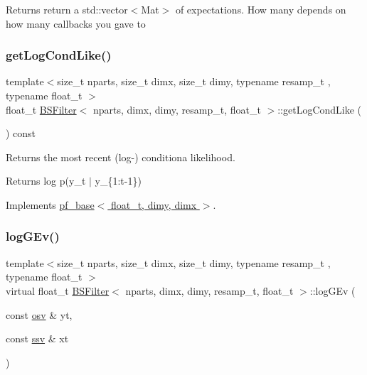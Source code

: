 \begin{DoxyReturn}{Returns}
return a std\+::vector$<$\+Mat$>$ of expectations. How many depends on how many callbacks you gave to 
\end{DoxyReturn}
\mbox{\label{classBSFilter_a6ab6ad2b7b5bd26d8f57af71e560f0a7}} 
\subsubsection{\texorpdfstring{get\+Log\+Cond\+Like()}{getLogCondLike()}}
{\footnotesize\ttfamily template$<$size\+\_\+t nparts, size\+\_\+t dimx, size\+\_\+t dimy, typename resamp\+\_\+t , typename float\+\_\+t $>$ \\
float\+\_\+t \hyperlink{classBSFilter}{B\+S\+Filter}$<$ nparts, dimx, dimy, resamp\+\_\+t, float\+\_\+t $>$\+::get\+Log\+Cond\+Like (\begin{DoxyParamCaption}{ }\end{DoxyParamCaption}) const\hspace{0.3cm}{\ttfamily [virtual]}}



Returns the most recent (log-\/) conditiona likelihood. 

\begin{DoxyReturn}{Returns}
log p(y\+\_\+t $\vert$ y\+\_\+\{1\+:t-\/1\}) 
\end{DoxyReturn}


Implements \hyperlink{classpf__base}{pf\+\_\+base$<$ float\+\_\+t, dimy, dimx $>$}.

\mbox{\label{classBSFilter_ae7ef5c414525879235f1e3b72833ced5}} 
\subsubsection{\texorpdfstring{log\+G\+Ev()}{logGEv()}}
{\footnotesize\ttfamily template$<$size\+\_\+t nparts, size\+\_\+t dimx, size\+\_\+t dimy, typename resamp\+\_\+t , typename float\+\_\+t $>$ \\
virtual float\+\_\+t \hyperlink{classBSFilter}{B\+S\+Filter}$<$ nparts, dimx, dimy, resamp\+\_\+t, float\+\_\+t $>$\+::log\+G\+Ev (\begin{DoxyParamCaption}\item[{const \hyperlink{classBSFilter_ad8512328484d7c7bd7a3b7a9481d7f37}{osv} \&}]{yt,  }\item[{const \hyperlink{classBSFilter_a0b5bc93957fb6b6b1282f31fa2e01c3c}{ssv} \&}]{xt }\end{DoxyParamCaption})\hspace{0.3cm}{\ttfamily [pure virtual]}}



